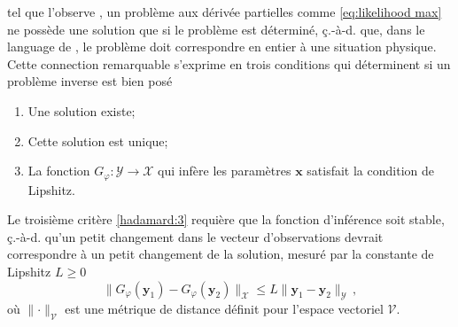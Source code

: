 tel que l'observe \citet{Hadamard1902}, un problème aux dérivée partielles comme \eqref{eq:likelihood max} 
ne possède une solution que si le problème est déterminé, ç.-à-d. que, dans le language de \citet{Hadamard1902}, 
le problème doit correspondre en entier à une situation physique. Cette connection remarquable s'exprime en trois conditions qui déterminent 
si un problème inverse est bien posé
\begin{enumerate}[label=(\subscript{H}{{\arabic*}})]
        \item \label{hadamard:1}Une solution existe;
        \item \label{hadamard:2}Cette solution est unique;
        \item \label{hadamard:3} La fonction $G_\varphi: \mathcal{Y} \rightarrow \mathcal{X}$ 
                qui infère les paramètres $\mathbf{x}$ satisfait la condition de Lipshitz.
\end{enumerate}
Le troisième critère \ref{hadamard:3} requière que la fonction d'inférence soit stable, ç.-à-d. qu'un petit changement 
dans le vecteur d'observations devrait correspondre à un petit changement de la solution, mesuré par la constante de Lipshitz
$L \geq 0$
\begin{equation}\label{eq:Lipshitz}
        \lVert G_\varphi(\mathbf{y}_1) - G_\varphi(\mathbf{y}_2)\rVert_{\mathcal{X}} \leq L \lVert \mathbf{y}_1 - \mathbf{y}_2\rVert_{\mathcal{Y}}\, ,
\end{equation}
où $\lVert \cdot \rVert_{\mathcal{V}}$ est une métrique de distance définit pour l'espace vectoriel $\mathcal{V}$.



